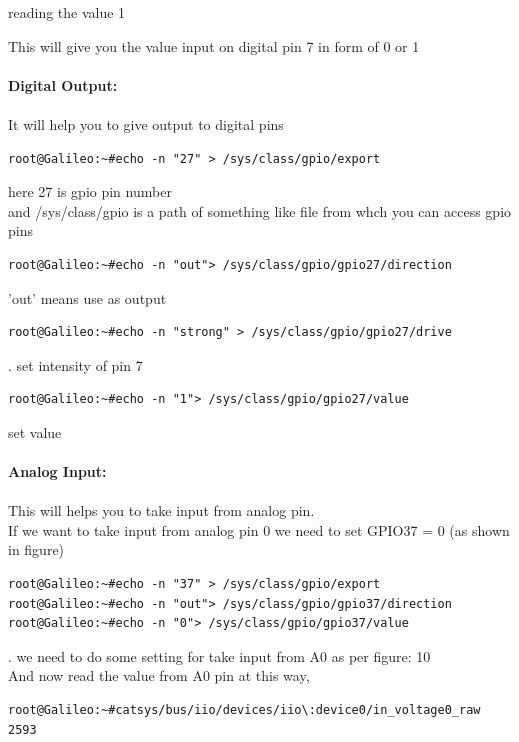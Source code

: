\documentclass[11pt,a4paper]{article}
\begin{document}
reading the value 1\\
\vspace{.3cm}

This will give you the value input on digital pin 7 in form of 0 or 1\\
\vspace{1cm}\\

\large{\textbf{Digital Output:}}\\
\vspace{.3cm}\\
It will help you to give output to digital pins\\
\begin{lstlisting}
root@Galileo:~#echo -n "27" > /sys/class/gpio/export
\end{lstlisting}
here 27 is gpio pin number\\

and /sys/class/gpio is a path of something like file from whch you can access gpio pins\\
\begin{lstlisting}
root@Galileo:~#echo -n "out"> /sys/class/gpio/gpio27/direction
\end{lstlisting}
'out' means use as output\\
\begin{lstlisting}
root@Galileo:~#echo -n "strong" > /sys/class/gpio/gpio27/drive
\end{lstlisting}.
set intensity of pin 7
\newpage
\begin{lstlisting}
root@Galileo:~#echo -n "1"> /sys/class/gpio/gpio27/value
\end{lstlisting}
set value\\
\vspace{1cm}\\
\large{\textbf{Analog Input:}}\\
\vspace{.3cm}\\
This will helps you to take input from analog pin.\\
If we want to take input from analog pin 0 we need to set GPIO37 = 0 (as shown in figure)\\
\begin{lstlisting}
root@Galileo:~#echo -n "37" > /sys/class/gpio/export
root@Galileo:~#echo -n "out"> /sys/class/gpio/gpio37/direction
root@Galileo:~#echo -n "0"> /sys/class/gpio/gpio37/value
\end{lstlisting}.
we need to do some setting for take input from A0 as per figure: 10\\
And now read the value from A0 pin at this way,\\
\begin{lstlisting}
root@Galileo:~#catsys/bus/iio/devices/iio\:device0/in_voltage0_raw
2593
\end{lstlisting}
\end{document}

